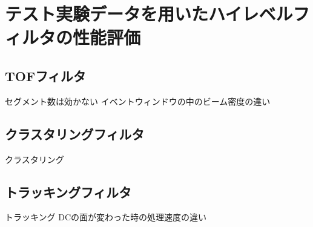 \documentclass[../main.tex]{subfiles}
\begin{document}
\section{テスト実験データを用いたハイレベルフィルタの性能評価}
\label{sec:methods}
\subsection{TOFフィルタ}
セグメント数は効かない
イベントウィンドウの中のビーム密度の違い
\subsection{クラスタリングフィルタ}
クラスタリング
\subsection{トラッキングフィルタ}
トラッキング
DCの面が変わった時の処理速度の違い
\end{document}
